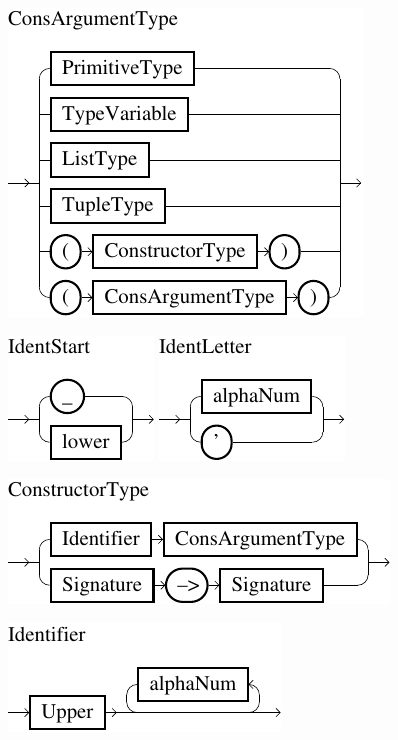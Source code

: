 \documentclass[%
	latex,%
	a4paper,%
	oneside,%
	chapterprefix,%
	headsepline,%
	12pt%
]{scrbook}
\begin{document}
\begin{minipage}{0.85\textwidth}
\begin{minipage}[t]{0.5\textwidth}
\vspace{1cm}
\includegraphics{bilder/ConsArgumentType} 

\end{minipage}
\begin{minipage}[t]{0.5\textwidth}

\vspace{1cm}

\includegraphics{bilder/identStart}
\includegraphics{bilder/identLetter}

\vspace{1.68cm}
\includegraphics{bilder/ConstructorType}

\vspace{1cm}
\includegraphics{bilder/Identifier}


\end{minipage}
\end{minipage}
\end{document}
